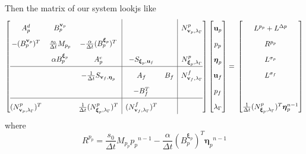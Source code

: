 \documentclass{article}
\newcommand{\mathspace}[1]{\ensuremath{#1}\xspace} %
\newcommand{\dt}{\mathspace{\Delta t}}
\newcommand{\matzero}{}        %
\newcommand{\uf}{\mathspace{\mathbf{u}_f}}
\newcommand{\vf}{\mathspace{\mathbf{v}_f}}
\newcommand{\up}{\mathspace{\mathbf{u}_p}}
\newcommand{\vp}{\mathspace{\mathbf{v}_p}}
\newcommand{\pf}{\mathspace{p_f}}
\newcommand{\pp}{\mathspace{p_p}}
\newcommand{\wf}{\mathspace{w_f}}
\renewcommand{\wp}{\mathspace{w_p}}
\newcommand{\disp}{\mathspace{\boldsymbol{\eta}_p}}
\newcommand{\disptest}{\mathspace{\boldsymbol{\xi}_p}}
\newcommand{\mult}{\mathspace{\lambda_{\Gamma}}}
\newcommand{\multtest}{\mathspace{\mu_{\Gamma}}}
\begin{document}
Then the matrix of our system lookjs like
\[ \renewcommand{\arraystretch}{1.8}
  \left[\begin{array}{@{}ccc|cc|c@{}}
          
          A^d_p & B^{\vp}_p & \matzero & \matzero & \matzero & N^p_{\vp, \mult} \\ %
          - (B^{\vp}_p)^T & \frac {s_0}{\dt} M_{\pp} & - \frac{\alpha}{\dt} (B^{\disptest}_p)^T & \matzero & \matzero & \matzero\\ %
          \matzero & \alpha B^{\disptest}_p & A^e_p & - S_{\disptest, \uf} & \matzero & N^p_{\disptest, \mult}\\ %
          \hline
          \matzero & \matzero & - \frac 1 {\dt} S_{\vf, \disp} & A_f & B_f & N^f_{\vf, \mult}\\ %
          \matzero & \matzero & \matzero & -B_f^T & \matzero & \matzero \\ %
          \hline
          (N^p_{\vp, \mult})^T & \matzero & \frac 1 {\dt} (N^p_{\disptest, \mult})^T & (N^f_{\vf, \mult})^T & \matzero & \matzero \\ %

        \end{array}\right]
      \left[\begin{array}{@{}c@{}}
                \up \\
                \pp \\
                \disp \\
                \uf \\
                \pf \\
                \mult
            \end{array}\right]
          = \newline
                      \left[\begin{array}{@{}c@{}}
                L^{\pp} + L^{\Delta p} \\
                              R^{\pp} \\
                L^{\sigma_p} \\
                L^{\sigma_f} \\
                \matzero \\
                \frac 1 {\dt} (N^p_{\disptest, \mult})^T \disp^{n-1} \\
        \end{array}\right]
\]
where
$$R^{\pp} = \frac {s_0}{\dt} M_{\pp} \pp^{n-1} - \frac {\alpha} {\dt} (B_p^{\disptest})^T \disp^{n-1}$$
\end{document}
